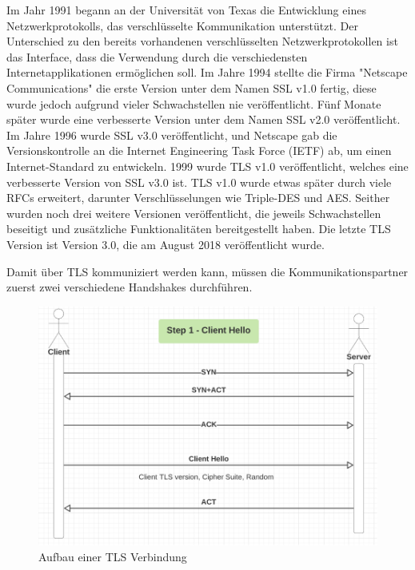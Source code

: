 Im Jahr 1991 begann an der Universität von Texas die Entwicklung eines Netzwerkprotokolls, das verschlüsselte Kommunikation unterstützt. Der Unterschied zu den bereits vorhandenen verschlüsselten Netzwerkprotokollen ist das Interface, dass die Verwendung durch die verschiedensten Internetapplikationen ermöglichen soll. Im Jahre 1994 stellte die Firma "Netscape Communications" die erste Version unter dem Namen SSL v1.0 fertig, diese wurde jedoch aufgrund vieler Schwachstellen nie veröffentlicht. Fünf Monate später wurde eine verbesserte Version unter dem Namen SSL v2.0 veröffentlicht. Im Jahre 1996 wurde SSL v3.0 veröffentlicht, und Netscape gab die Versionskontrolle an die Internet Engineering Task Force (IETF) ab, um einen Internet-Standard zu entwickeln. 1999 wurde TLS v1.0 veröffentlicht, welches eine verbesserte Version von SSL v3.0 ist. TLS v1.0 wurde etwas später durch viele RFCs erweitert, darunter Verschlüsselungen wie Triple-DES und AES. Seither wurden noch drei weitere Versionen veröffentlicht, die jeweils Schwachstellen beseitigt und zusätzliche Funktionalitäten bereitgestellt haben. Die letzte TLS Version ist Version 3.0, die am August 2018 veröffentlicht wurde. \cite{WikiTLS} 

Damit über TLS kommuniziert werden kann, müssen die Kommunikationspartner zuerst zwei verschiedene Handshakes durchführen. 

\begin{figure}[H]
    \centering
    \includegraphics{media/OpenSSL/VerbindungsAufbau.png}
    \caption{Aufbau einer TLS Verbindung \cite{DeepDiveTLS}}
\end{figure}

